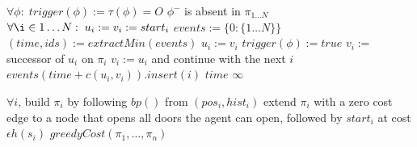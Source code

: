 \documentclass[letterpaper]{article}
\begin{document}
\begin{algorithm}
\caption{$greedyCost(\pi_1,\ldots,\pi_n)$}
\label{alg:update}
\begin{algorithmic}
\STATE $\forall\phi:\; trigger(\phi) := \tau(\phi) = O$ \OR $\phi^-$ is absent in $\pi_{1\ldots N}$
\STATE $\forall \i\in 1\ldots N:\; u_i := v_i := start_i$
\STATE $events := \{0: \{1\ldots N\}\}$
\STATE $(time, ids) := extractMin(events)$
\STATE $u_i := v_i$
\STATE $trigger(\phi) := true$
\ENDIF
\ENDFOR
\ENDFOR
{}
\STATE $v_i :=$ successor of $u_i$ on $\pi_i$
\STATE $v_i := u_i$ and continue with the next $i$
\ENDIF
\ENDFOR
\STATE $events(time+c(u_i,v_i)).insert(i)$
\ENDFOR
\ENDWHILE
{}
\RETURN $time$
\ELSE
\RETURN $\infty$
\ENDIF
\end{algorithmic}
\end{algorithm}

\begin{algorithm}
\caption{$jointPriority((pos_1,hist_1),\ldots,(pos_N,hist_N))$}
\label{alg:update}
\begin{algorithmic}
\STATE $\forall i$, build $\pi_i$ by following $bp()$ from $(pos_i, hist_i)$
\STATE extend $\pi_i$ with a zero cost edge to a node that opens all doors the agent can open, followed by $start_i$ at cost $\epsilon h(s_i)$
\ENDFOR
\RETURN $greedyCost(\pi_1,\ldots,\pi_n)$
\end{algorithmic}
\end{algorithm}



\end{document}
